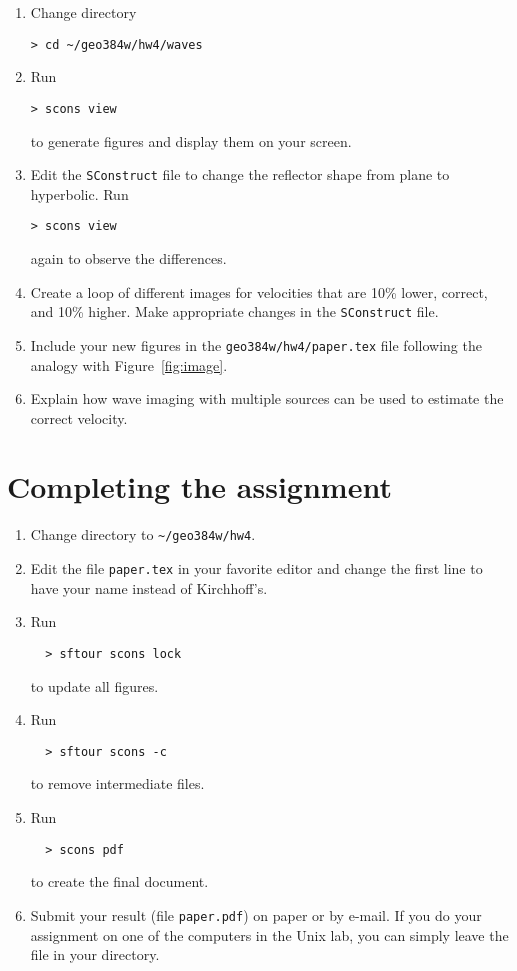 \begin{enumerate}
\begin{enumerate}
\item Change directory 
\begin{verbatim}
> cd ~/geo384w/hw4/waves
\end{verbatim}
\item Run
\begin{verbatim}
> scons view
\end{verbatim}
  to generate figures and display them on your screen.
\item Edit the \texttt{SConstruct} file to change the reflector shape
  from plane to hyperbolic. Run 
\begin{verbatim}
> scons view
\end{verbatim}
  again to observe the differences.
\item Create a loop of different images for velocities that are 10\% lower, correct, 
and 10\% higher. Make appropriate changes in the \texttt{SConstruct} file.
\item Include your new figures in the \texttt{geo384w/hw4/paper.tex} file following the analogy with 
Figure~\ref{fig:image}.
\item Explain how wave imaging with multiple sources can be used to estimate the correct velocity. 
\end{enumerate}

\end{enumerate}

\section{Completing the assignment}

\begin{enumerate}
\item Change directory to \verb#~/geo384w/hw4#.
\item Edit the file \texttt{paper.tex} in your favorite editor and change the
  first line to have your name instead of Kirchhoff's.
\item Run
\begin{verbatim}
  > sftour scons lock
\end{verbatim}
to update all figures.
\item Run
\begin{verbatim}
  > sftour scons -c
\end{verbatim}
  to remove intermediate files.
\item Run
 \begin{verbatim} 
  > scons pdf
\end{verbatim}
  to create the final document.
\item Submit your result (file \texttt{paper.pdf}) on paper or by
  e-mail. If you do your assignment on one of the computers in the
  Unix lab, you can simply leave the file in your directory.
\end{enumerate}

